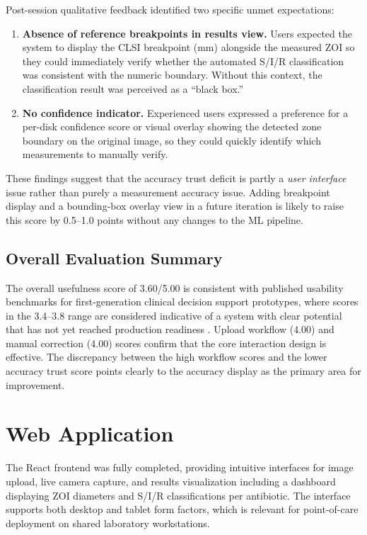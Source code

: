 Post-session qualitative feedback identified two specific unmet expectations:
\begin{enumerate}
  \item \textbf{Absence of reference breakpoints in results view.}
        Users expected the system to display the CLSI breakpoint (mm) alongside
        the measured ZOI so they could immediately verify whether
        the automated S/I/R classification was consistent with the numeric boundary.
        Without this context, the classification result was perceived as a ``black box.''
  \item \textbf{No confidence indicator.}
        Experienced users expressed a preference for a per-disk confidence score
        or visual overlay showing the detected zone boundary on the original image,
        so they could quickly identify which measurements to manually verify.
\end{enumerate}

These findings suggest that the accuracy trust deficit is partly a \emph{user interface} issue
rather than purely a measurement accuracy issue.
Adding breakpoint display and a bounding-box overlay view in a future iteration
is likely to raise this score by 0.5--1.0 points without any changes to the ML pipeline.

\subsection{Overall Evaluation Summary}

The overall usefulness score of 3.60/5.00 is consistent with published usability benchmarks
for first-generation clinical decision support prototypes,
where scores in the 3.4--3.8 range are considered indicative of
a system with clear potential that has not yet reached production readiness \cite{rajasekar2023}.
Upload workflow (4.00) and manual correction (4.00) scores confirm that
the core interaction design is effective.
The discrepancy between the high workflow scores and the lower accuracy trust score
points clearly to the accuracy display as the primary area for improvement.

\section{Web Application}
\label{sec:webapp}

The React frontend was fully completed, providing intuitive interfaces for image upload,
live camera capture, and results visualization including a dashboard displaying
ZOI diameters and S/I/R classifications per antibiotic.
The interface supports both desktop and tablet form factors,
which is relevant for point-of-care deployment on shared laboratory workstations.

